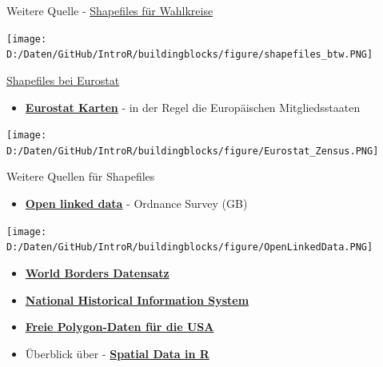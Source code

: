 \documentclass[ignorenonframetext,]{beamer}
\providecommand{\tightlist}{%
  \setlength{\itemsep}{0pt}\setlength{\parskip}{0pt}}
\begin{document}
\begin{frame}{Weitere Quelle -
\href{https://www.bundeswahlleiter.de/bundestagswahlen/2017/wahlkreiseinteilung/downloads.html}{Shapefiles
für Wahlkreise}}

\texttt{[image: D:/Daten/GitHub/IntroR/buildingblocks/figure/shapefiles\_btw.PNG]}

\end{frame}

\begin{frame}{\href{http://ec.europa.eu/eurostat/de/web/gisco/geodata/reference-data/administrative-units-statistical-units}{Shapefiles
bei Eurostat}}

\begin{itemize}
\tightlist
\item
  \href{http://epp.eurostat.ec.europa.eu/portal/page/portal/gisco_Geographical_information_maps/popups/\%20references/administrative_units_statistical_units_1}{\textbf{Eurostat
  Karten}} - in der Regel die Europäischen Mitgliedsstaaten
\end{itemize}

\texttt{[image: D:/Daten/GitHub/IntroR/buildingblocks/figure/Eurostat\_Zensus.PNG]}

\end{frame}

\begin{frame}{Weitere Quellen für Shapefiles}

\begin{itemize}
\tightlist
\item
  \href{https://www.ordnancesurvey.co.uk/business-and-government/products/opendata-products-grid.html}{\textbf{Open
  linked data}} - Ordnance Survey (GB)
\end{itemize}

\texttt{[image: D:/Daten/GitHub/IntroR/buildingblocks/figure/OpenLinkedData.PNG]}

\begin{itemize}
\item
  \href{http://thematicmapping.org/downloads/world_borders.php}{\textbf{World
  Borders Datensatz}}
\item
  \href{https://www.nhgis.org/}{\textbf{National Historical Information
  System}}
\item
  \href{http://www.freemapdata.com/html/free_polygon_data.html}{\textbf{Freie
  Polygon-Daten für die USA}}
\item
  Überblick über -
  \href{https://science.nature.nps.gov/im/datamgmt/statistics/r/advanced/spatial.cfm}{\textbf{Spatial
  Data in R}}
\end{itemize}

\end{frame}
\end{document}

